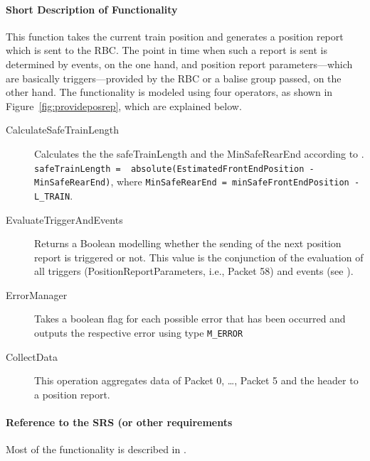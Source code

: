 \paragraph{Short Description of Functionality}
This function takes the current train position and generates a position report which is sent to the RBC. The point in time when such a report is sent is determined by events, on the one hand, and position report parameters---which are basically triggers---provided by the RBC or a balise group passed, on the other hand. The functionality is modeled using four operators, as shown in Figure~\ref{fig:provideposrep}, which are explained below.
\begin{description}
	\item[CalculateSafeTrainLength] Calculates the the safeTrainLength and the MinSafeRearEnd according to \cite[Chapter~3.6.5.2.4/5]{subset-026}. \\
\verb+safeTrainLength =  absolute(EstimatedFrontEndPosition - MinSafeRearEnd)+, where
\verb+MinSafeRearEnd = minSafeFrontEndPosition - L_TRAIN+.
	\item[EvaluateTriggerAndEvents] Returns a Boolean modelling whether the sending of the next position report is triggered or not. This value is the conjunction of the evaluation of all triggers (PositionReportParameters, i.e., Packet 58) and events (see \cite[Chapter~3.6.5.1.4]{subset-026}).
	\item[ErrorManager] Takes a boolean flag for each possible error that has been occurred and outputs the respective error using type \verb+M_ERROR+
	\item[CollectData] This operation aggregates data of Packet 0, \dots, Packet 5 and the header to a position report.
\end{description}

\paragraph{Reference to the SRS (or other requirements}
Most of the functionality is described in \cite[Chapter~3.6.5]{subset-026}.

